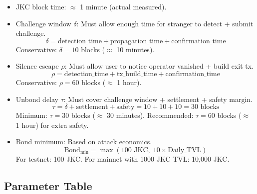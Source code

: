 \documentclass[a4paper,11pt]{article}
\begin{document}
\begin{itemize}[nosep]
    \item JKC block time: $\approx$ 1 minute (actual measured).
    \item Challenge window $\delta$: Must allow enough time for stranger to detect + submit challenge.
    \[
        \delta = \text{detection\_time} + \text{propagation\_time} + \text{confirmation\_time}
    \]
    Conservative: $\delta = 10$ blocks ($\approx$ 10 minutes).

    \item Silence escape $\rho$: Must allow user to notice operator vanished + build exit tx.
    \[
        \rho = \text{detection\_time} + \text{tx\_build\_time} + \text{confirmation\_time}
    \]
    Conservative: $\rho = 60$ blocks ($\approx$ 1 hour).

    \item Unbond delay $\tau$: Must cover challenge window + settlement + safety margin.
    \[
        \tau = \delta + \text{settlement} + \text{safety} = 10 + 10 + 10 = 30 \text{ blocks}
    \]
    Minimum: $\tau = 30$ blocks ($\approx$ 30 minutes). Recommended: $\tau = 60$ blocks ($\approx$ 1 hour) for extra safety.

    \item Bond minimum: Based on attack economics.
    \[
        \text{Bond}_{\min} = \max(100 \text{ JKC},\; 10 \times \text{Daily\_TVL})
    \]
    For testnet: 100 JKC. For mainnet with 1000 JKC TVL: 10,000 JKC.
\end{itemize}

\subsection{Parameter Table}
\end{document}
